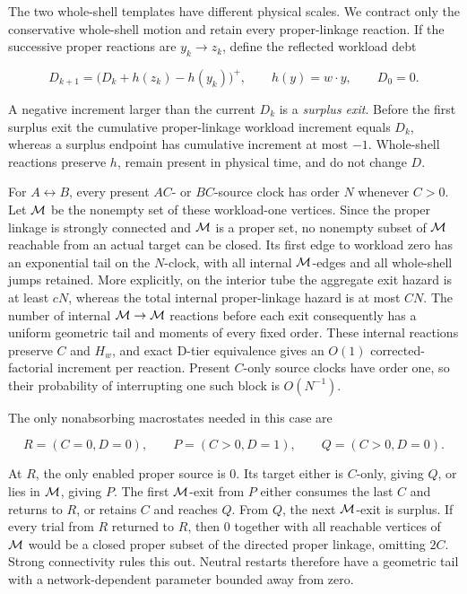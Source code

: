 The two whole-shell templates have different physical scales. We
contract only the conservative whole-shell motion and retain every
proper-linkage reaction. If the successive proper reactions are
\(y_k\to z_k\), define the reflected workload debt

\[
 D_{k+1}=\bigl(D_k+h(z_k)-h(y_k)\bigr)^+,
 \qquad h(y)=w\mathbin{\cdot}y,\qquad D_0=0.             \tag{4.5}
\]

A negative increment larger than the current \(D_k\) is a \emph{surplus
exit}. Before the first surplus exit the cumulative proper-linkage
workload increment equals \(D_k\), whereas a surplus endpoint has
cumulative increment at most \(-1\). Whole-shell reactions preserve
\(h\), remain present in physical time, and do not change \(D\).

For \(A\leftrightarrow B\), every present \(AC\)- or \(BC\)-source clock
has order \(N\) whenever \(C>0\). Let \({\cal M}\) be the nonempty set
of these workload-one vertices. Since the proper linkage is strongly
connected and \({\cal M}\) is a proper set, no nonempty subset of
\({\cal M}\) reachable from an actual target can be closed. Its first
edge to workload zero has an exponential tail on the \(N\)-clock, with
all internal \({\cal M}\)-edges and all whole-shell jumps retained. More
explicitly, on the interior tube the aggregate exit hazard is at least
\(cN\), whereas the total internal proper-linkage hazard is at most
\(CN\). The number of internal \({\cal M}\to{\cal M}\) reactions before
each exit consequently has a uniform geometric tail and moments of every
fixed order. These internal reactions preserve \(C\) and \(H_w\), and
exact D-tier equivalence gives an \(O(1)\) corrected-factorial increment
per reaction. Present \(C\)-only source clocks have order one, so their
probability of interrupting one such block is \(O(N^{-1})\).

The only nonabsorbing macrostates needed in this case are

\[
 R=(C=0,D=0),\qquad P=(C>0,D=1),\qquad Q=(C>0,D=0).     \tag{4.6}
\]

At \(R\), the only enabled proper source is \(0\). Its target either is
\(C\)-only, giving \(Q\), or lies in \({\cal M}\), giving \(P\). The
first \({\cal M}\)-exit from \(P\) either consumes the last \(C\) and
returns to \(R\), or retains \(C\) and reaches \(Q\). From \(Q\), the
next \({\cal M}\)-exit is surplus. If every trial from \(R\) returned to
\(R\), then \(0\) together with all reachable vertices of \({\cal M}\)
would be a closed proper subset of the directed proper linkage, omitting
\(2C\). Strong connectivity rules this out. Neutral restarts therefore
have a geometric tail with a network-dependent parameter bounded away
from zero.

